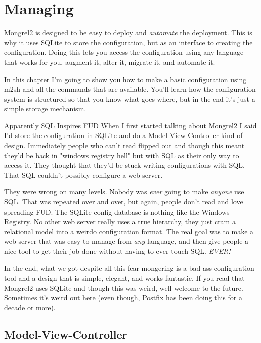 \chapter{Managing}

Mongrel2 is designed to be easy to deploy and \emph{automate} the deployment.
This is why it uses \href{http://www.sqlite.org/}{SQLite} to store the configuration,
but  as an interface to creating the configuration.  Doing this lets
you access the configuration using any language that works for you, augment it,
alter it, migrate it, and automate it.

In this chapter I'm going to show you how to make a basic configuration using
m2sh and all the commands that are available.  You'll learn how the configuration
system is structured so that you know what goes where, but in the end it's just
a simple storage mechanism.

\begin{aside}{Apparently SQL Inspires FUD}
When I first started talking about Mongrel2 I said I'd store the configuration
in SQLite and do a Model-View-Controller kind of design.  Immediately people who
can't read flipped out and though this meant they'd be back in "windows registry hell"
but with SQL as their only way to access it.  They thought that they'd be stuck writing
configurations with SQL.  That SQL couldn't possibly configure a web server.

They were wrong on many levels.  Nobody was \emph{ever} going to make \emph{anyone} use
SQL.  That was repeated over and over, but again, people don't read and love spreading
FUD.  The SQLite config database is nothing like the Windows Registry.  No other web
server really uses a true hierarchy, they just cram a relational model into a weirdo
configuration format.  The real goal was to make a web server that was easy to manage from
\emph{any} language, and then give people a nice tool to get their job done without
having to ever touch SQL.  \emph{EVER!}

In the end, what we got despite all this fear mongering is a bad ass configuration
tool and a design that is simple, elegant, and works fantastic.  If you read that
Mongrel2 uses SQLite and though this was weird, well welcome to the future.  Sometimes
it's weird out here (even though, Postfix has been doing this for a decade or more).
\end{aside}


\section{Model-View-Controller}

